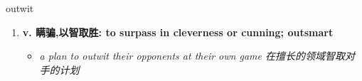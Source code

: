 
\begin{frame}
{\huge outwit}
\begin{center}
\begin{enumerate}\Large
  \item \textbf{v. 瞒骗,以智取胜: to surpass in cleverness or cunning; outsmart}
  \begin{itemize}
    \item \em{\Large{a plan to outwit their opponents at their own game 在擅长的领域智取对手的计划}}
  \end{itemize}
\end{enumerate}
\end{center}
\end{frame}
